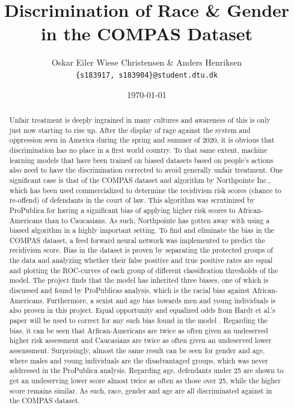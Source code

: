 \documentclass[11pt, fleqn, titlepage]{article}
\title{Discrimination of Race \& Gender in the COMPAS Dataset}
\author{Oskar Eiler Wiese Christensen \& Anders Henriksen \\ \texttt{\{s183917, s183904\}@student.dtu.dk}}
\date{\today}
\begin{document}
	
	\maketitle
	\begin{abstract}
	\small
	\noindent
	Unfair treatment is deeply ingrained in many cultures and awareness of this is only just now starting to rise up. After the display of rage against the system and oppression seen in America during the spring and summer of 2020, it is obvious that discrimination has no place in a first world country. To that same extent, machine learning models that have been trained on biased datasets based on people's actions also need to have the discrimination corrected to avoid generally unfair treatment. One significant case is that of the COMPAS dataset and algorithm by Northpointe Inc., which has been used commercialized to determine the recidivism risk scores (chance to re-offend) of defendants in the court of law. This algorithm was scrutinized by ProPublica for having a significant bias of applying higher risk scores to African-Americans than to Caucasians. As such, Northpointe has gotten away with using a biased algorithm in a highly important setting. To find and eliminate the bias in the COMPAS dataset, a feed forward neural network was implemented to predict the recidivism score. Bias in the dataset is proven by separating the protected groups of the data and analyzing whether their false positive and true positive rates are equal and plotting the ROC-curves of each group of different classification thresholds of the model. The project finds that the model has inherited three biases, one of which is discussed and found by ProPublicas analysis, which is the racial bias against African-Americans. Furthermore, a sexist and age bias towards men and young individuals is also proven in this project. Equal opportunity and equalized odds from Hardt et al.'s paper will be used to correct for any such bias found in the model \cite{equal_of_oppor}. Regarding the bias, it can be seen that Arfican-Americans are twice as often given an undeserved higher risk assessment and Caucasians are twice as often given an undeserved lower assenssment. Surprisingly, almost the same result can be seen for gender and age, where males and young individuals are the disadvantaged groups, which was never addressed in the ProPublica analysis. Regarding age, defendants under 25 are shown to get an undeserving lower score almost twice as often as those over 25, while the higher score remains similar. As such, race, gender and age are all discriminated against in the COMPAS dataset. 

\end{abstract}
\end{document}
